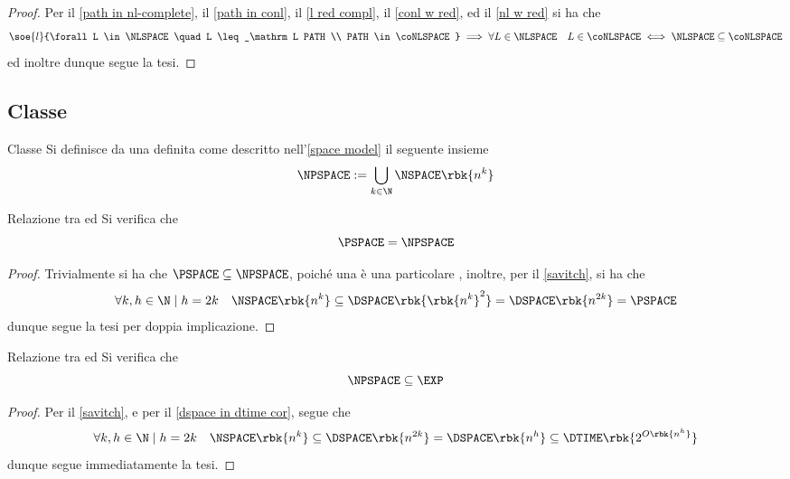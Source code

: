 \documentclass[a4paper, 12pt]{report}
\begin{document}
    \begin{proof}
        Per il \cref{path in nl-complete}, il \cref{path in conl}, il \cref{l red compl}, il \cref{conl w red}, ed il \cref{nl w red} si ha che $$\soe{l}{\forall L \in \NLSPACE \quad L \leq_\mathrm L PATH \\ PATH \in \coNLSPACE} \implies \forall L \in \NLSPACE \quad L \in \coNLSPACE \iff \NLSPACE \subseteq \coNLSPACE$$ ed inoltre  dunque segue la tesi.
    \end{proof}

    \subsection{Classe \NPSPACE}

    \begin{frameddefn}{Classe \NPSPACE}
        Si definisce  da una \NTM definita come descritto nell'\cref{space model} il seguente insieme $$\NPSPACE := \bigcup_{k \in \N}{\NSPACE \rbk{n^k}}$$
    \end{frameddefn}

    \begin{framedprop}[label={pspace = npspace}]{Relazione tra \PSPACE ed \NPSPACE}
        Si verifica che $$\PSPACE = \NPSPACE$$
    \end{framedprop}

    \begin{proof}
        Trivialmente si ha che $\PSPACE \subseteq \NPSPACE$, poiché una \TM è una particolare \NTM, inoltre, per il \cref{savitch}, si ha che $$\forall k, h \in \N \mid h = 2k \quad \NSPACE \rbk{n^k} \subseteq \DSPACE \rbk{\rbk{n^k}^2} = \DSPACE \rbk{n^{2k}} = \PSPACE$$ dunque segue la tesi per doppia implicazione.
    \end{proof}

    \begin{framedprop}[label={npspace in exp}]{Relazione tra \NPSPACE ed \EXP}
        Si verifica che $$\NPSPACE \subseteq \EXP$$
    \end{framedprop}

    \begin{proof}
        Per il \cref{savitch}, e per il \cref{dspace in dtime cor}, segue che $$\forall k, h \in \N \mid h = 2k \quad \NSPACE \rbk{n^k} \subseteq \DSPACE \rbk{n^{2k}} = \DSPACE \rbk{n^{h}} \subseteq \DTIME \rbk{2^{O \rbk{n^h}}}$$ dunque segue immediatamente la tesi.
    \end{proof}
\end{document}
